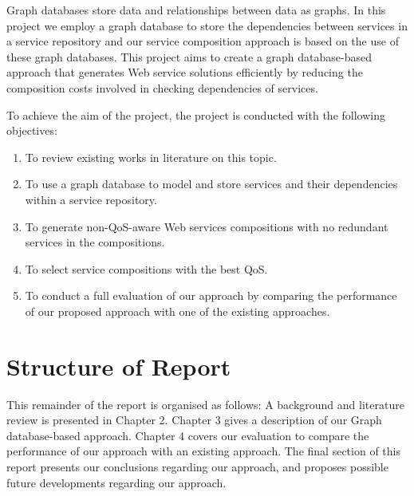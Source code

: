 Graph databases store data and relationships between data as graphs. In this project we employ a graph database to store the dependencies between services in a service repository and our service composition approach is based on the use of these graph databases. This project aims to create a graph database-based approach that generates Web service solutions efficiently by reducing the composition costs involved in checking dependencies of services. 

To achieve the aim of the project, the project is conducted with the following objectives:
\begin{enumerate}
  \item To review existing works in literature on this topic.
  \item To use a graph database to model and store services and their dependencies within a service repository.
  \item To generate non-QoS-aware Web services compositions with no redundant services in the compositions.
  \item To select service compositions with the best QoS. 
  \item To conduct a full evaluation of our approach by comparing the performance of our proposed approach with one of the existing approaches.
\end{enumerate}



\section{Structure of Report} 
This remainder of the report is organised as follows: A background and literature review is presented in Chapter 2. Chapter 3 gives a description of our Graph database-based approach. Chapter 4 covers our evaluation to compare the performance of our approach with an existing approach.  The final section of this report presents our conclusions regarding our approach, and proposes possible future developments regarding our approach.


